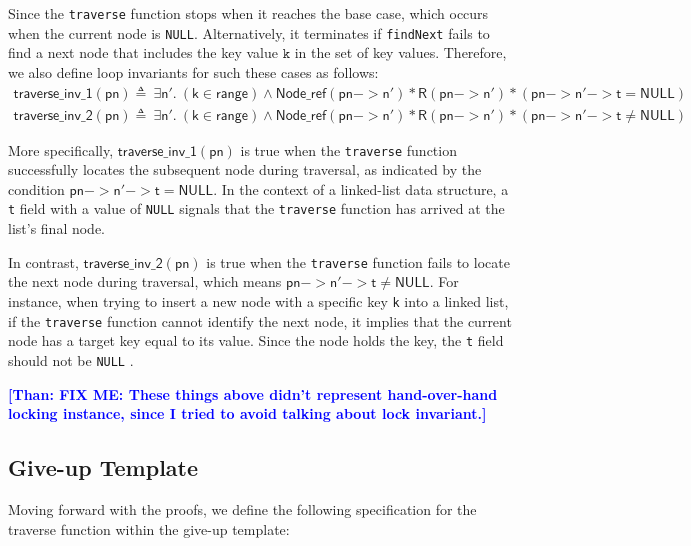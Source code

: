 \documentclass[a4paper,UKenglish,cleveref, autoref, thm-restate]{lipics-v2021}
\newcommand{\nodeboxrep}{\ensuremath{\mathsf{Node\_ref}}}
\newcommand{\than}[1]{\textbf{\textcolor{blue}{[Than: #1]}}}
\begin{document}
Since the \lstinline{traverse} function stops when it reaches the base case, which occurs when the current node is \lstinline{NULL}. Alternatively, it terminates if \lstinline{findNext} fails to find a next node that includes the key value $\texttt{k}$ in the set of key values. Therefore, we also define loop invariants for such these cases as follows: 
\begin{align*} 
	\mathsf{traverse\_inv\_1 (pn)} \triangleq\ \exists \mathsf{n'}.\ (\mathsf{k} \in \mathsf{range})\land \nodeboxrep(\mathsf{pn->n'})  \ast \mathsf{R(pn->n')} \ast (\mathsf{pn->n'->t} = \mathsf{NULL})
	\\
	\mathsf{traverse\_inv\_2 (pn)} \triangleq\  \exists \mathsf{n'}.\ (\mathsf{k} \in \mathsf{range})\land \nodeboxrep(\mathsf{pn->n'})  \ast \mathsf{R(pn->n')} \ast (\mathsf{pn->n'->t} \neq \mathsf{NULL})
\end{align*}

More specifically, $\mathsf{traverse\_inv\_1 (pn)}$ is true when the \lstinline{traverse} function successfully locates the subsequent node during traversal, as indicated by the condition $\mathsf{pn->n'->t} = \mathsf{NULL}$. In the context of a linked-list data structure, a \lstinline{t} field with a value of \lstinline{NULL} signals that the \lstinline{traverse} function has arrived at the list's final node.

In contrast, $\mathsf{traverse\_inv\_2 (pn)}$ is true when the \lstinline{traverse} function fails to locate the next node during traversal, which means $\mathsf{pn->n'->t} \neq \mathsf{NULL}$. For instance, when trying to insert a new node with a specific key \lstinline{k} into a linked list, if the \lstinline{traverse} function cannot identify the next node, it implies that the current node has a target key equal to its value. Since the node holds the key, the \lstinline{t} field should not be \lstinline{NULL} .

\than{FIX ME: These things above didn't represent hand-over-hand locking instance, since I tried to avoid talking about lock invariant.}




\subsection{Give-up Template}
Moving forward with the proofs, we define the following specification for the traverse function within the give-up template:
\end{document}
